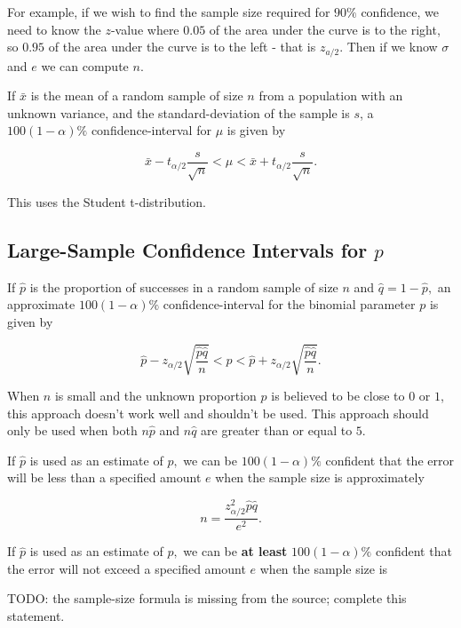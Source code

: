 \documentclass{article}
\begin{document}
For example, if we wish to find the sample size required for $90\%$ confidence, we need to know the $z$-value where $0.05$ of the area under the curve is to the right, so $0.95$ of the area under the curve is to the left - that is $z_{a/2}.$ Then if we know $\sigma$ and $e$ we can compute $n.$

\begin{theorem}\label{ci-mean-unknown-variance}
If $\bar{x}$ is the mean of a random sample of size $n$ from a population with an unknown \@{variance}, and the \@{standard-deviation} of the sample is $s$, a $100(1-\alpha)\%$ \@{confidence-interval} for $\mu$ is given by

\[ \bar{x} - t_{\alpha/2} \frac{s}{\sqrt{n}} < \mu < \bar{x} + t_{\alpha/2} \frac{s}{\sqrt{n}}. \]
\end{theorem}

This uses the Student t-distribution.

\subsection{Large-Sample Confidence Intervals for $p$}

\begin{theorem}\label{ci-proportion}
If $\hat{p}$ is the proportion of successes in a random sample of size $n$ and $\hat{q} = 1 - \hat{p},$ an approximate $100(1-\alpha)\%$ \@{confidence-interval} for the binomial parameter $p$ is given by

\[ \hat{p} - z_{\alpha / 2 }\sqrt{\frac{\hat{p}\hat{q}}{n}} < p < \hat{p} + z_{\alpha/2} \sqrt{\frac{\hat{p}\hat{q}}{n}}. \]
\end{theorem}

\begin{note}
When $n$ is small and the unknown proportion $p$ is believed to be close to $0$ or $1$, this approach doesn't work well and shouldn't be used. This approach should only be used when both $n\hat{p}$ and $n\hat{q}$ are greater than or equal to $5.$
\end{note}

\begin{theorem}\label{sample-size-proportion}
If $\hat{p}$ is used as an estimate of $p,$ we can be $100(1 - \alpha)\%$ confident that the error will be less than a specified amount $e$ when the sample size is approximately

\[ n = \frac{z_{\alpha/2}^2 \hat{p} \hat{q}}{e^2}. \]
\end{theorem}

\begin{theorem}\label{sample-size-proportion-conservative}
If $\hat{p}$ is used as an estimate of $p,$ we can be \textbf{at least} $100(1-\alpha)\%$ confident that the error will not exceed a specified amount $e$ when the sample size is

TODO: the sample-size formula is missing from the source; complete this statement.
\end{theorem}
\end{document}
